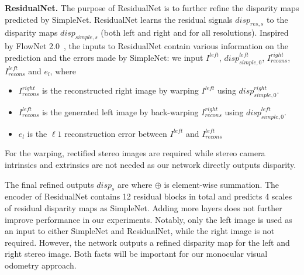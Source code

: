 \documentclass[runningheads]{llncs}
\begin{document}
\textbf{ResidualNet.} 
The purpose of ResidualNet is to further refine the disparity maps predicted by SimpleNet. 
ResidualNet learns the residual signals $\mathit{disp}_{\mathit{res},s}$ to the disparity maps $\mathit{disp}_{\mathit{simple},s}$ (both left and right and for all resolutions). 
Inspired by FlowNet 2.0~\cite{ilg2017flownet}, the inputs to ResidualNet contain various information on the prediction and the errors made by SimpleNet: 
we input $I^{\mathit{left}}$, 
$\mathit{disp}_{\mathit{simple},0}^{\mathit{left}}$, 
$I^{\mathit{right}}_{\mathit{recons}}$, 
$I^{\mathit{left}}_{\mathit{recons}}$ and $e_l$, where
\begin{itemize}
	\item $I^{\mathit{right}}_{\mathit{recons}}$ is the reconstructed right image by warping 
	$I^{\mathit{left}}$ using $\mathit{disp}_{\mathit{simple},0}^{\mathit{right}}$.
	\item $I^{\mathit{left}}_{\mathit{recons}}$ is the generated left image by back-warping 
	$I^{\mathit{right}}_{\mathit{recons}}$ using $\mathit{disp}_{\mathit{simple},0}^{\mathit{left}}$.
	\item $e_l$ is the $\ell1$ reconstruction error between $I^{\mathit{left}}$ and 
	$I^{\mathit{left}}_{\mathit{recons}}$
\end{itemize}
For the warping, rectified stereo images are required while stereo camera intrinsics and extrinsics are not needed as our network directly outputs disparity.

The final refined outputs $\mathit{disp}_s$ are
where $\oplus$ is element-wise summation. 
The encoder of ResidualNet contains 12 residual blocks in total and predicts 4 scales of residual 
disparity maps as SimpleNet. Adding more layers does not further improve performance in our experiments.
Notably, only the left image is used as an input to either SimpleNet and ResidualNet, while the right image is not required.
However, the network outputs a refined disparity map for the left and right stereo image.
Both facts will be important for our monocular visual odometry approach.
\end{document}
